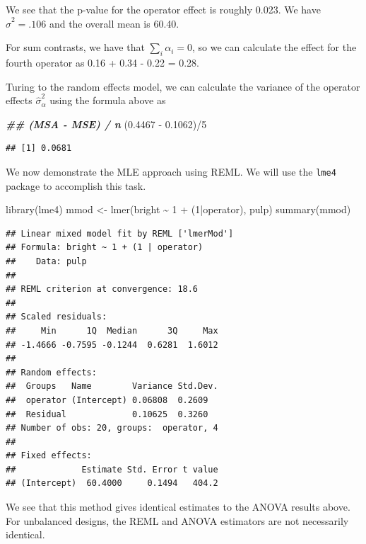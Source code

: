 \documentclass[
  ignorenonframetext,
]{beamer}
\newenvironment{Shaded}{\begin{snugshade}}{\end{snugshade}}
\newcommand{\DecValTok}[1]{\textcolor[rgb]{0.00,0.00,0.81}{#1}}
\newcommand{\DocumentationTok}[1]{\textcolor[rgb]{0.56,0.35,0.01}{\textbf{\textit{#1}}}}
\newcommand{\FloatTok}[1]{\textcolor[rgb]{0.00,0.00,0.81}{#1}}
\newcommand{\FunctionTok}[1]{\textcolor[rgb]{0.00,0.00,0.00}{#1}}
\newcommand{\NormalTok}[1]{#1}
\newcommand{\OtherTok}[1]{\textcolor[rgb]{0.56,0.35,0.01}{#1}}
\newcommand{\SpecialCharTok}[1]{\textcolor[rgb]{0.00,0.00,0.00}{#1}}
\begin{document}
\begin{frame}[fragile]{}
\protect\hypertarget{section-1}{}
We see that the p-value for the operator effect is roughly 0.023. We
have \(\hat{\sigma}^2 = .106\) and the overall mean is 60.40.

For sum contrasts, we have that \(\sum_i\alpha_i = 0\), so we can
calculate the effect for the fourth operator as 0.16 + 0.34 - 0.22 =
0.28.

Turing to the random effects model, we can calculate the variance of the
operator effects \(\hat{\sigma}^2_{\alpha}\) using the formula above as

\vspace{12pt}

\begin{Shaded}
\begin{Highlighting}[]
\DocumentationTok{\#\# (MSA {-} MSE) / n }
\NormalTok{(}\FloatTok{0.4467} \SpecialCharTok{{-}} \FloatTok{0.1062}\NormalTok{)}\SpecialCharTok{/}\DecValTok{5}
\end{Highlighting}
\end{Shaded}

\begin{verbatim}
## [1] 0.0681
\end{verbatim}
\end{frame}

\begin{frame}[fragile]{}
\protect\hypertarget{section-2}{}
We now demonstrate the MLE approach using REML. We will use the
\texttt{lme4} package to accomplish this task.

\vspace{12pt}
\tiny

\begin{Shaded}
\begin{Highlighting}[]
\FunctionTok{library}\NormalTok{(lme4)}
\NormalTok{mmod }\OtherTok{\textless{}{-}} \FunctionTok{lmer}\NormalTok{(bright }\SpecialCharTok{\textasciitilde{}} \DecValTok{1} \SpecialCharTok{+}\NormalTok{ (}\DecValTok{1}\SpecialCharTok{|}\NormalTok{operator), pulp)}
\FunctionTok{summary}\NormalTok{(mmod)}
\end{Highlighting}
\end{Shaded}

\begin{verbatim}
## Linear mixed model fit by REML ['lmerMod']
## Formula: bright ~ 1 + (1 | operator)
##    Data: pulp
## 
## REML criterion at convergence: 18.6
## 
## Scaled residuals: 
##     Min      1Q  Median      3Q     Max 
## -1.4666 -0.7595 -0.1244  0.6281  1.6012 
## 
## Random effects:
##  Groups   Name        Variance Std.Dev.
##  operator (Intercept) 0.06808  0.2609  
##  Residual             0.10625  0.3260  
## Number of obs: 20, groups:  operator, 4
## 
## Fixed effects:
##             Estimate Std. Error t value
## (Intercept)  60.4000     0.1494   404.2
\end{verbatim}

\vspace{12pt}
\normalsize

We see that this method gives identical estimates to the ANOVA results
above. For unbalanced designs, the REML and ANOVA estimators are not
necessarily identical.
\end{frame}
\end{document}
